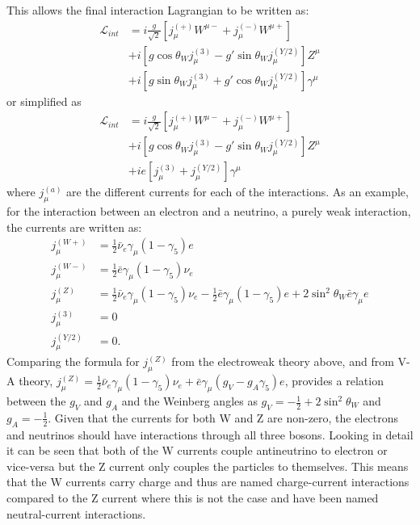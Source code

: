 This allows the final interaction Lagrangian to be written as:
\begin{align}
\mathcal{L}_{int}&=i\frac{g}{\sqrt{2}}[j_\mu^{(+)}W^{\mu-}+j_\mu^{(-)}W^{\mu+}]\\ \nonumber
&+i[g\cos\theta_Wj_\mu^{(3)}-g'\sin\theta_Wj_\mu^{(Y/2)}]Z^\mu\\ \nonumber
&+i[g\sin\theta_Wj_\mu^{(3)}+g'\cos\theta_Wj_\mu^{(Y/2)}]\gamma^\mu
\end{align}
or simplified as 
\begin{align}
\mathcal{L}_{int}&=i\frac{g}{\sqrt{2}}[j_\mu^{(+)}W^{\mu-}+j_\mu^{(-)}W^{\mu+}]\\ \nonumber
&+i[g\cos\theta_Wj_\mu^{(3)}-g'\sin\theta_Wj_\mu^{(Y/2)}]Z^\mu\\ \nonumber
&+ie[j_\mu^{(3)}+j_\mu^{(Y/2)}]\gamma^\mu
\end{align}
where $j_{\mu}^{(a)}$ are the different currents for each of the interactions. As an example, for the interaction between an electron and a neutrino, a purely weak interaction, the currents are written as:
\begin{align}
j_\mu^{(W+)}&=\frac{1}{2}\bar{\nu}_e\gamma_\mu(1-\gamma_5)e\\
j_\mu^{(W-)}&=\frac{1}{2}\bar{e}\gamma_\mu(1-\gamma_5)\nu_e\\
j_\mu^{(Z)}&=\frac{1}{2}\bar{\nu}_e\gamma_\mu(1-\gamma_5)\nu_e-\frac{1}{2}\bar{e}\gamma_\mu(1-\gamma_5)e+2\sin^2\theta_W\bar{e}\gamma_\mu e\\
j_\mu^{(3)}&=0\\
j_\mu^{(Y/2)}&=0.
\end{align}
Comparing the formula for $j_\mu^{(Z)}$ from the electroweak theory above, and from V-A theory, $j_\mu^{(Z)}=\frac{1}{2}\bar{\nu}_e\gamma_\mu(1-\gamma_5)\nu_e+\bar{e}\gamma_\mu(g_V-g_A\gamma_5)e$, provides a relation between the $g_V$ and $g_A$ and the Weinberg angles as $g_V=-\frac{1}{2}+2\sin^2\theta_W$ and $g_A = -\frac{1}{2}$. Given that the currents for both W and Z are non-zero, the electrons and neutrinos should have interactions through all three bosons. Looking in detail it can be seen that both of the W currents couple antineutrino to electron or vice-versa but the Z current only couples the particles to themselves. This means that the W currents carry charge and thus are named charge-current interactions compared to the Z current where this is not the case and have been named neutral-current interactions.


